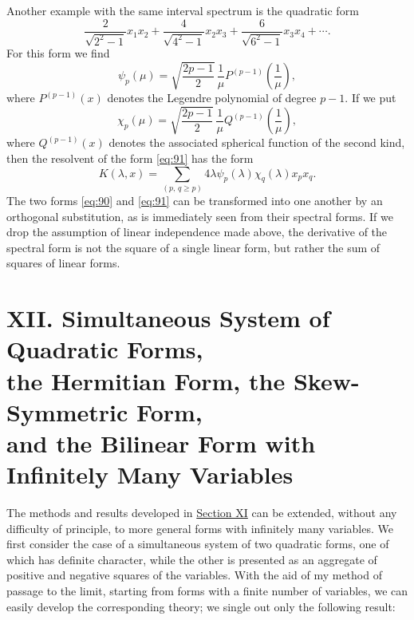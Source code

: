 \documentclass[b5paper,twoside]{article}
\newcommand{\originalpage}[1]{\phantomsection\label{origpage:#1}}
\begin{document}
Another example with the same interval spectrum is the quadratic form
\begin{equation}
  \frac{2}{\sqrt{2^2-1}}x_1x_2
  +\frac{4}{\sqrt{4^2-1}}x_2x_3
  +\frac{6}{\sqrt{6^2-1}}x_3x_4+\cdots.
  \tag{91}\label{eq:91}
\end{equation}
For this form we find
\[
  \psi_p(\mu)=\sqrt{\frac{2p-1}{2}}\,\frac{1}{\mu}
  P^{(p-1)}\!\left(\frac{1}{\mu}\right),
\]
where $P^{(p-1)}(x)$ denotes the Legendre polynomial of degree $p-1$.
If we put
\[
  \chi_p(\mu)=\sqrt{\frac{2p-1}{2}}\,\frac{1}{\mu}
  Q^{(p-1)}\!\left(\frac{1}{\mu}\right),
\]
where $Q^{(p-1)}(x)$ denotes the associated spherical function of the
second kind, then
\originalpage{209}
the resolvent of the form \eqref{eq:91} has the form
\[
  K(\lambda,x)
  =\sum_{(p,\,q\geq p)}4\lambda\psi_p(\lambda)\chi_q(\lambda)x_px_q.
\]
The two forms \eqref{eq:90} and \eqref{eq:91} can be transformed into one
another by an orthogonal substitution, as is immediately seen from their
spectral forms. If we drop the assumption of linear independence made
above, the derivative of the spectral form is not the square of a single
linear form, but rather the sum of squares of linear forms.

\section*{XII. Simultaneous System of Quadratic Forms,\\
the Hermitian Form, the Skew-Symmetric Form,\\
and the Bilinear Form with Infinitely Many Variables}
\label{sec:XII}

The methods and results developed in \hyperref[sec:XI]{Section XI} can be
extended, without any difficulty of principle, to more general forms with
infinitely many variables. We first consider the case of a simultaneous
system of two quadratic forms, one of which has definite character, while
the other is presented as an aggregate of positive and negative squares of
the variables. With the aid of my method of passage to the limit, starting
from forms with a finite number of variables, we can easily develop the
corresponding theory; we single out only the following result:
\end{document}
